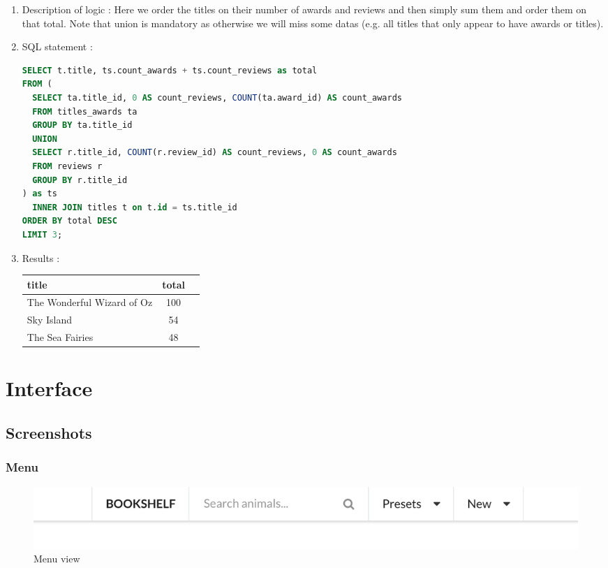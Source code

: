 \documentclass[doubleside, titlepage]{article}
\begin{document}
	\begin{enumerate}
	\item Description of logic : Here we order the titles on their number of awards and reviews and then simply sum them and order them on that total. Note that union is mandatory as otherwise we will miss some datas (e.g. all titles that only appear to have awards or titles).
	\item SQL statement :
		\begin{lstlisting}[language=SQL,showspaces=false,basicstyle=\ttfamily,numberstyle=\tiny,commentstyle=\color{gray}]
SELECT t.title, ts.count_awards + ts.count_reviews as total
FROM (
  SELECT ta.title_id, 0 AS count_reviews, COUNT(ta.award_id) AS count_awards
  FROM titles_awards ta
  GROUP BY ta.title_id
  UNION
  SELECT r.title_id, COUNT(r.review_id) AS count_reviews, 0 AS count_awards
  FROM reviews r
  GROUP BY r.title_id
) as ts
  INNER JOIN titles t on t.id = ts.title_id
ORDER BY total DESC
LIMIT 3;
		\end{lstlisting}

	\item Results :\\

	\begin{tabular}{|l|c|r|}
	  \hline
		title & total\\
	  \hline
		The Wonderful Wizard of Oz	& 100\\
		Sky Island	& 54\\
		The Sea Fairies	& 48\\
	  \hline
	\end{tabular}
\end{enumerate}

\newpage
\section{Interface}

\subsection{Screenshots}

\subsubsection{Menu}
\begin{figure}[!htb]
	\centering
    \includegraphics[scale = 0.5]{ui-menu}
    \caption{Menu view}
\end{figure}
\end{document}
